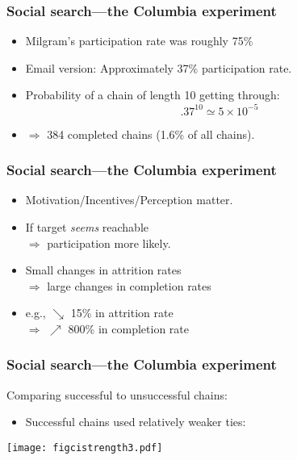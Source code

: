 \begin{frame}
  \frametitle{Social search---the Columbia experiment}

  \begin{block}{}
  \begin{itemize}
  \item<1->
    Milgram's participation rate was roughly 75\%
  \item<2->
    Email version: Approximately 37\% participation rate.
  \item<3->
    Probability of a chain of length 10 getting through:
    $$.37^{10} \simeq 5 \times 10^{-5}$$
  \item<4->
  $\Rightarrow$ 384 completed chains (1.6\% of all chains).
  \end{itemize}
  \end{block}
  
\end{frame}

\begin{frame}
  \frametitle{Social search---the Columbia experiment}


  \begin{block}{}
  \begin{itemize}
  \item<1->  
    Motivation/Incentives/Perception matter.
  \item<2->  
    If target \textit{seems} reachable\\
    $\Rightarrow$ participation more likely.
  \item<3->  
    Small changes in attrition rates\\
    $\Rightarrow$ large changes in completion rates
  \item<4->  
    e.g., $\searrow$ 15\% in attrition rate \\
    $\Rightarrow$ $\nearrow$ 800\% in completion rate
  \end{itemize}
  \end{block}

\end{frame}

\begin{frame}
  \frametitle{Social search---the Columbia experiment}  

  \begin{block}{Comparing successful to unsuccessful chains:}
    \begin{itemize}
    \item 
      Successful chains used relatively weaker ties:
    \end{itemize}
    \texttt{[image: figcistrength3.pdf]}
  \end{block}

\end{frame}


